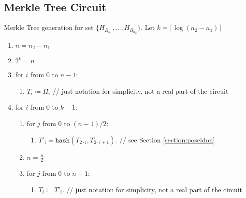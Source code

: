 \subsection{Merkle Tree Circuit}
\label{section:merkle}

Merkle Tree generation for set $\{H_{B_{n_1}}, ..., H_{B_{n_2}}\}$.
Let $k = \lceil \log(n_2 - n_1) \rceil$

\begin{enumerate}
    \item $n = n_2 - n_1$
    \item $2^k = n$
    \item for $i$ from $0$ to $n - 1$:
    \begin{enumerate}
        \item $T_i \coloneqq H_i$ // just notation for simplicity, not a real part of the circuit
    \end{enumerate}
    \item for $i$ from $0$ to $k - 1$:
    \begin{enumerate}
        \item for $j$ from $0$ to $(n - 1) / 2$:
        \begin{enumerate}
            \item $T'_i = \texttt{hash}(T_{2 \cdot  i}, T_{2 \cdot i + 1})$. // see Section \ref{section:poseidon}
        \end{enumerate}
        \item $n = \frac{n}{2}$
        \item for $j$ from $0$ to $n - 1$:
        \begin{enumerate}
            \item $T_i \coloneqq T'_i$. // just notation for simplicity, not a real part of the circuit
        \end{enumerate}
    \end{enumerate}
\end{enumerate}
